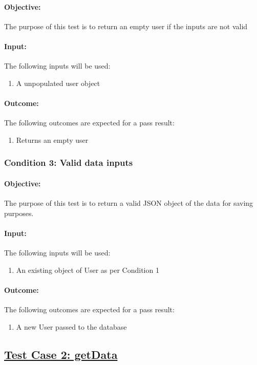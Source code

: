 \documentclass{article}
\begin{document}
\paragraph{Objective:} The purpose of this test is to return an empty user if the inputs are not valid
\paragraph{Input:} The following inputs will be used:
\begin{enumerate}
	\item A unpopulated user object
\end{enumerate}
\paragraph{Outcome:} The following outcomes are expected for a pass result:
\begin{enumerate}
	\item Returns an empty user
\end{enumerate}
\subsubsection{Condition 3: Valid data inputs}
\paragraph{Objective:} The purpose of this test is to return a valid JSON object of the data for saving purposes.
\paragraph{Input:} The following inputs will be used:
\begin{enumerate}
	\item An existing object of User as per Condition 1
\end{enumerate}
\paragraph{Outcome:} The following outcomes are expected for a pass result:
\begin{enumerate}
	\item A new User passed to the database
\end{enumerate}

\subsection{\underline{Test Case 2: getData}}\label{test2}
\end{document}
